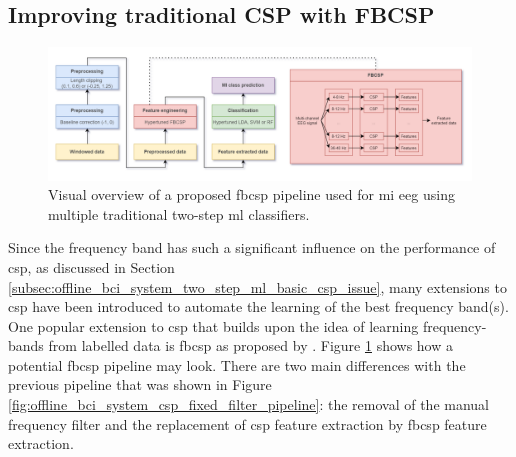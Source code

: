 
\subsection{Improving traditional CSP with FBCSP}
\label{subsec:offline_bci_system_two_step_ml_basic_csp_improving}

\begin{figure}[t]
    \centering
    \includegraphics[width=\linewidth]{../images/offline/fbcsp_pipeline.pdf}
    \captionsetup{width=0.8\linewidth}
    \captionsetup{justification=centering}
    \caption{Visual overview of a proposed \gls{fbcsp} pipeline used for \gls{mi} \gls{eeg} using multiple traditional two-step \gls{ml} classifiers.}
    \label{fig:offline_bci_system_fbcsp_pipeline}
\end{figure}

Since the frequency band has such a significant influence on the performance of \gls{csp}, as discussed in Section \ref{subsec:offline_bci_system_two_step_ml_basic_csp_issue}, many extensions to \gls{csp} have been introduced to automate the learning of the best frequency band(s).
One popular extension to \gls{csp} that builds upon the idea of learning frequency-bands from labelled data is \gls{fbcsp} as proposed by \citet{eeg_model_fbcsp}.
Figure \ref{fig:offline_bci_system_fbcsp_pipeline} shows how a potential \gls{fbcsp} pipeline may look.
There are two main differences with the previous pipeline that was shown in Figure \ref{fig:offline_bci_system_csp_fixed_filter_pipeline}: the removal of the manual frequency filter and the replacement of \gls{csp} feature extraction by \gls{fbcsp} feature extraction.

